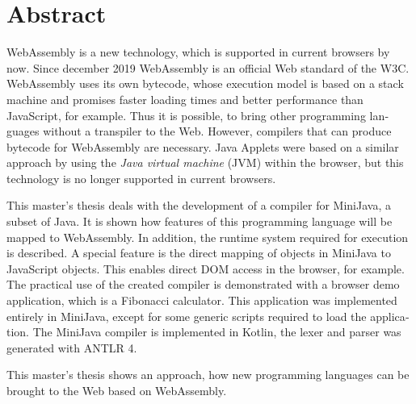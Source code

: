 \chapter{Abstract}


\begin{english}
WebAssembly is a new technology, which is supported in current browsers by now. Since december 2019 WebAssembly is an official Web standard of the W3C. WebAssembly uses its own bytecode, whose execution model is based on a stack machine and promises faster loading times and better performance than JavaScript, for example. Thus it is possible, to bring other programming languages without a transpiler to the Web. However, compilers that can produce bytecode for WebAssembly are necessary. Java Applets were based on a similar approach by using the \emph{Java virtual machine} (JVM) within the browser, but this technology is no longer supported in current browsers.

This master's thesis deals with the development of a compiler for MiniJava, a subset of Java. It is shown how features of this programming language will be mapped to WebAssembly. In addition, the runtime system required for execution is described. A special feature is the direct mapping of objects in MiniJava to JavaScript objects. This enables direct DOM access in the browser, for example. The practical use of the created compiler is demonstrated with a browser demo application, which is a Fibonacci calculator. This application was implemented entirely in MiniJava, except for some generic scripts required to load the application. The MiniJava compiler is implemented in Kotlin, the lexer and parser was generated with ANTLR 4.

This master's thesis shows an approach, how new programming languages can be brought to the Web based on WebAssembly.
\end{english}
